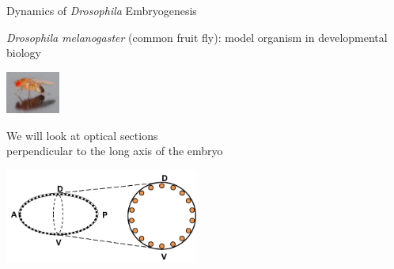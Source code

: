 \documentclass[12pt]{beamer}
\begin{document}
\begin{frame}{Dynamics of {\em Drosophila} Embryogenesis}

\begin{minipage}[b]{0.7\textwidth}
{\small
 {\em Drosophila melanogaster} (common fruit fly): model organism in developmental biology \par}
%
\end{minipage}
\hspace{0.2in}
\includegraphics[width=0.7in]{drosophila_picture}

\begin{center}
We will look at optical sections \\ perpendicular to the long axis of the embryo

\includegraphics[width=2.5in]{drosophila_schematic}


\end{center}

\end{frame}
\end{document}
